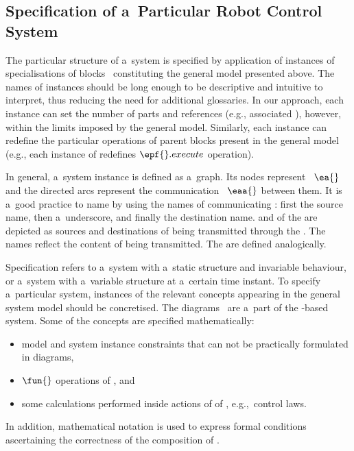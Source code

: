 \documentclass[11pt,oneside,a4paper]{article}
\begin{document}
	
	\subsection{Specification of a~Particular Robot Control System}
	\label{sec:spec-spec}
	
	The particular structure of a~system is specified by application of instances of specialisations of blocks~\cite{Friedenthal:2015} constituting the general model presented above.
	The names of instances should be long enough to be descriptive and intuitive to interpret, thus reducing the need for additional glossaries.
	In our approach, each instance can set the number of parts and references (e.g., associated \Buffers{}), however, within the limits imposed by the general model.
	Similarly, each instance can redefine the particular operations of parent blocks present in the general model (e.g., each instance of \PrimitiveTransitionFunction{}
	redefines $\epf{}.execute$ operation).
	
	In general, a~system instance is defined as a~graph. Its nodes represent \Agents{}~$\ea{}$ and the directed arcs represent the communication \Links{}~$\eaa{}$ between them.
	It is a~good practice to name \Links{} by using the names of communicating \Agents{}: first the source \Agent{} name, then a~underscore, and finally the destination \Agent{} name.
	\InputBuffers{} and \OutputBuffers{} of the \ControlSubsystems{} are depicted as sources and destinations of \ValueTypes{} being transmitted through the \Links{}.
	The \Buffer{} names reflect the content of \ValueType{} being transmitted. The \Subsystems{} are defined analogically.
	
	Specification refers to a~system with a~static structure and invariable behaviour, or a~system with a~variable structure at a~certain time instant. To specify a~particular system, instances of the relevant concepts appearing in the general system model should be concretised. The \SysML{} diagrams~\cite{systems7020019} are a~part of
	the \EARL{}-based system. Some of the \EARL{} concepts are specified mathematically:
	\begin{itemize}
		\item model and system instance constraints that can not be practically formulated in diagrams,
		\item $\fun{}$ operations of \Predicates{}, and
		\item some calculations performed inside actions of \Activity{} \Diagrams{} of \PrimitiveTransitionFunctions{}, e.g.,\ control laws.
	\end{itemize}
	In addition, mathematical notation is used to express formal conditions ascertaining the correctness of the composition of \PrimitiveTransitionFunctions{}.
	
\end{document}
